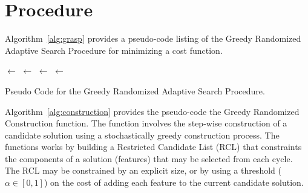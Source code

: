 \documentclass[a4paper, 11pt]{article}
\begin{document}
\section{Procedure}
\label{sec:procedure}
Algorithm~\ref{alg:grasp} provides a pseudo-code listing of the Greedy Randomized Adaptive Search Procedure for minimizing a cost function.

\begin{algorithm}[ht]
	\SetLine
	\KwIn{\Alpha}
	\KwOut{\Best}
	\Best $\leftarrow$ \ConstructRandomSolution{}\;
	\While{$\neg$ \StopCondition{}} {
		\Candidate $\leftarrow$ \GreedyRandomizedConstruction{\Alpha}\;
		\Candidate $\leftarrow$ \LocalSearch{\Candidate}\;
		\If{\Cost{\Candidate} $<$ \Cost{\Best}} {
			\Best $\leftarrow$ \Candidate\;
		}
	}
	\Return{\Best}\;
	\caption{Pseudo Code for the Greedy Randomized Adaptive Search Procedure.}
	\label{alg:grasp}
\end{algorithm}

Algorithm~\ref{alg:construction} provides the pseudo-code the Greedy Randomized Construction function. The function involves the step-wise construction of a candidate solution using a stochastically greedy construction process. The functions works by building a Restricted Candidate List (RCL) that constraints the components of a solution (features) that may be selected from each cycle. The RCL may be constrained by an explicit size, or by using a threshold ($\alpha \in [0,1]$) on the cost of adding each feature to the current candidate solution.
\end{document}
